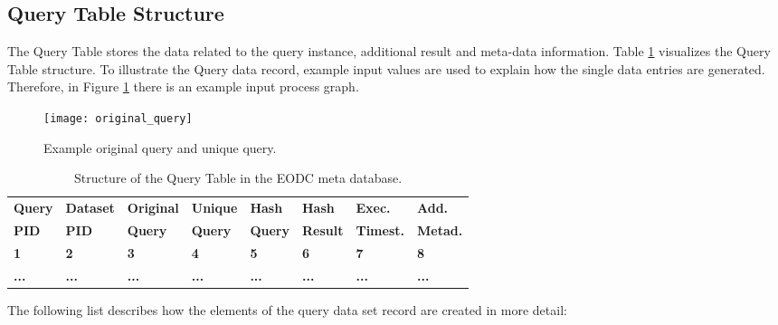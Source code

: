 \documentclass[draft,final]{vutinfth} %
\begin{document}
\subsection{Query Table Structure}

The Query Table stores the data related to the query instance, additional result and meta-data information. Table \ref{Tab:querytable} visualizes the Query Table structure. To illustrate the Query data record, example input values are used to explain how the single data entries are generated. Therefore, in Figure \ref{fig:processgraph_example} there is an example input process graph.   

\begin{figure}[h]
	\centering
	\texttt{[image: original\_query]}
	\caption{Example original query and unique query.}
	\label{fig:processgraph_example} %
\end{figure} 

\begin{table}[]
	\caption{Structure of the Query Table in the EODC meta database.}
	\begin{tabular}{|l|l|l|l|l|l|l|l|}
	\hline	\textbf{Query} & \textbf{Dataset} & \textbf{Original} & \textbf{Unique} & \textbf{Hash} & \textbf{Hash} &
		\textbf{Exec.} & \textbf{Add.}  \\ 
		\textbf{PID} & \textbf{PID} & \textbf{Query} & \textbf{Query} & \textbf{Query} & \textbf{Result} &
		\textbf{Timest.} & \textbf{Metad.}  \\ \hline
		\textbf{1} & \textbf{2} & \textbf{3} & \textbf{4} & \textbf{5} & \textbf{6} &
		\textbf{7} & \textbf{8} \\ \hline
		\textbf{...} & \textbf{...} & \textbf{...} & \textbf{...} & \textbf{...} & \textbf{...} & \textbf{...} & \textbf{...} \\ \hline
	\end{tabular}
	\label{Tab:querytable}
\end{table}

The following list describes how the elements of the query data set record are created in more detail:
\end{document}
